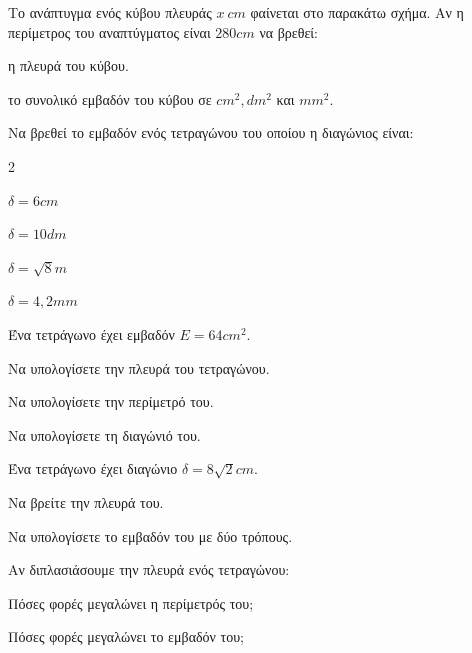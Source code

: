 \documentclass[11pt,a4paper,modern]{FFExercises}
\begin{document}
\askhsh Το ανάπτυγμα ενός κύβου πλευράς $x\ \si{cm}$ φαίνεται στο παρακάτω σχήμα. Αν η περίμετρος του αναπτύγματος είναι $280\si{cm}$ να βρεθεί:
\begin{center}
\end{center}
\begin{alist}
\item η πλευρά του κύβου.
\item το συνολικό εμβαδόν του κύβου σε $\si{cm^2},\si{dm^2}$ και $\si{mm^2}$.
\end{alist}
\askhsh Να βρεθεί το εμβαδόν ενός τετραγώνου του οποίου η διαγώνιος είναι:
\begin{multicols}{2}
\begin{alist}
\item $\delta=6\si{cm}$
\item $\delta=10\si{dm}$
\item $\delta=\sqrt{8}\si{m}$
\item $\delta=4{,}2\si{mm}$
\end{alist}
\end{multicols}

\askhsh Ένα τετράγωνο έχει εμβαδόν $E=64\si{cm^2}$.
\begin{alist}
\item Να υπολογίσετε την πλευρά του τετραγώνου.
\item Να υπολογίσετε την περίμετρό του.
\item Να υπολογίσετε τη διαγώνιό του.
\end{alist}

\askhsh Ένα τετράγωνο έχει διαγώνιο $\delta=8\sqrt{2}\si{cm}$.
\begin{alist}
\item Να βρείτε την πλευρά του.
\item Να υπολογίσετε το εμβαδόν του με δύο τρόπους.
\end{alist}

\askhsh Αν διπλασιάσουμε την πλευρά ενός τετραγώνου:
\begin{alist}
\item Πόσες φορές μεγαλώνει η περίμετρός του;
\item Πόσες φορές μεγαλώνει το εμβαδόν του;
\end{alist}
\end{document}
